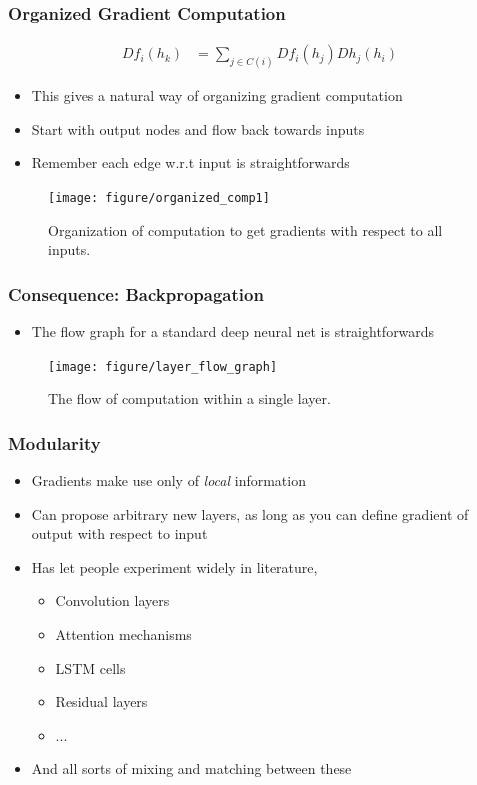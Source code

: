 \documentclass[10pt,mathserif]{beamer}
\begin{document}
\begin{frame}
  \frametitle{Organized Gradient Computation}
  \begin{align*}
    Df_{i}\left(h_k\right) &= \sum_{j \in C\left(i\right)}
    Df_{i}\left(h_{j}\right)Dh_{j}\left(h_{i}\right)
  \end{align*}
  \begin{itemize}
  \item This gives a natural way of organizing gradient computation
  \item Start with output nodes and flow back towards inputs
  \item Remember each edge w.r.t input is straightforwards
  \end{itemize}
  \begin{figure}[ht]
    \centering
    \texttt{[image: figure/organized\_comp1]}
    \caption{Organization of computation to get gradients with respect to all
      inputs. \label{fig:organized_comp1} }
  \end{figure}
\end{frame}

\begin{frame}
  \frametitle{Consequence: Backpropagation}
  \begin{itemize}
  \item The flow graph for a standard deep neural net is straightforwards
  \end{itemize} 
  \begin{figure}[ht]
    \centering
    \texttt{[image: figure/layer\_flow\_graph]}
    \caption{The flow of computation within a single layer. \label{fig:layer_flow_graph} }
  \end{figure}
\end{frame}

\begin{frame}
  \frametitle{Modularity}
  \begin{itemize}
  \item Gradients make use only of \textit{local} information
  \item Can propose arbitrary new layers, as long as you can define gradient of
    output with respect to input
  \item Has let people experiment widely in literature,
    \begin{itemize}
    \item Convolution layers \citep{lecun1995convolutional}
    \item Attention mechanisms \citep{olah2016attention}
    \item LSTM cells \citep{schmidhuber1997long}
    \item Residual layers \citep{he2016deep}
    \item ...
    \end{itemize}
  \item And all sorts of mixing and matching between these
  \end{itemize}
\end{frame}
\end{document}
